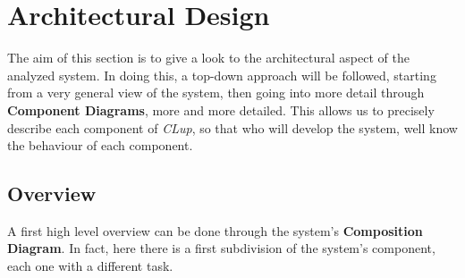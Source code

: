 \documentclass{article}
\begin{document}
\section{Architectural Design}
	The aim of this section is to give a look to the architectural aspect of the analyzed system. In doing this, a top-down approach will be followed, starting from a very general view of the system, then going into more detail through {\bfseries Component Diagrams}, more and more detailed. This allows us to precisely describe each component of \emph{CLup}, so that who will develop the system, well know the behaviour of each component.
	
	\subsection{Overview}
	A first high level overview can be done through the system's \textbf{Composition Diagram}. In fact, here there is a first subdivision of the system's component, each one with a different task.
\end{document}
